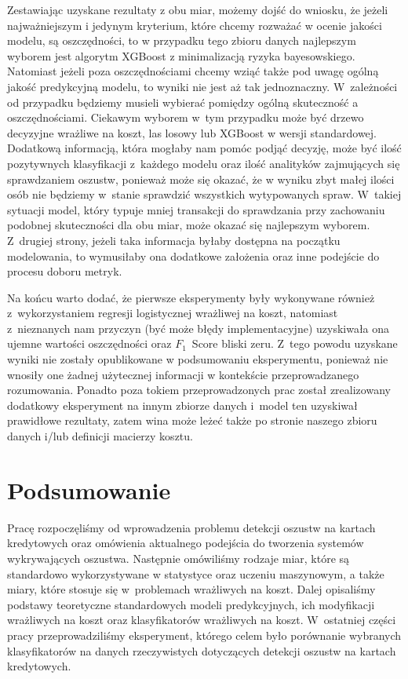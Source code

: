 \documentclass[inzynierska]{pwr_wmat_praca_dyplomowa}
\theoremstyle{plain}
\numberwithin{theorem}{chapter}
\theoremstyle{definition}
\numberwithin{theorem}{chapter}
\begin{document}
Zestawiając uzyskane rezultaty z obu miar, możemy dojść do wniosku, że jeżeli najważniejszym i jedynym kryterium, które chcemy rozważać w ocenie jakości modelu, są oszczędności, to w przypadku tego zbioru danych najlepszym wyborem jest algorytm XGBoost z minimalizacją ryzyka bayesowskiego. Natomiast jeżeli poza oszczędnościami chcemy wziąć także pod uwagę ogólną jakość predykcyjną modelu, to wyniki nie jest aż tak jednoznaczny. W~zależności od przypadku będziemy musieli wybierać pomiędzy ogólną skuteczność a oszczędnościami. Ciekawym wyborem w~tym przypadku może być drzewo decyzyjne wrażliwe na koszt, las losowy lub XGBoost w wersji standardowej. Dodatkową informacją, która mogłaby nam pomóc podjąć decyzję, może być ilość pozytywnych klasyfikacji z~każdego modelu oraz ilość analityków zajmujących się sprawdzaniem oszustw, ponieważ może się okazać, że w wyniku zbyt małej ilości osób nie będziemy w~stanie sprawdzić wszystkich wytypowanych spraw. W~takiej sytuacji model, który typuje mniej transakcji do sprawdzania przy zachowaniu podobnej skuteczności dla obu miar, może okazać się najlepszym wyborem. Z~drugiej strony, jeżeli taka informacja byłaby dostępna na początku modelowania, to wymusiłaby ona dodatkowe założenia oraz inne podejście do procesu doboru metryk.

Na końcu warto dodać, że pierwsze eksperymenty były wykonywane również z~wykorzystaniem regresji logistycznej wrażliwej na koszt, natomiast z~nieznanych nam przyczyn (być może błędy implementacyjne) uzyskiwała ona ujemne wartości oszczędności oraz $F_1$~Score bliski zeru. Z~tego powodu uzyskane wyniki nie zostały opublikowane w podsumowaniu eksperymentu, ponieważ nie wnosiły one żadnej użytecznej informacji w kontekście przeprowadzanego rozumowania. Ponadto poza tokiem przeprowadzonych prac został zrealizowany dodatkowy eksperyment na innym zbiorze danych i~model ten uzyskiwał prawidłowe rezultaty, zatem wina może leżeć także po stronie naszego zbioru danych i/lub definicji macierzy kosztu.

\chapter*{Podsumowanie}
 
Pracę rozpoczęliśmy od wprowadzenia problemu detekcji oszustw na kartach kredytowych oraz omówienia aktualnego podejścia do tworzenia systemów wykrywających oszustwa. Następnie omówiliśmy rodzaje miar, które są standardowo wykorzystywane w statystyce oraz uczeniu maszynowym, a także miary, które stosuje się w~problemach wrażliwych na koszt. Dalej opisaliśmy podstawy teoretyczne standardowych modeli predykcyjnych, ich modyfikacji wrażliwych na koszt oraz klasyfikatorów wrażliwych na koszt. W~ostatniej części pracy przeprowadziliśmy eksperyment, którego celem było porównanie wybranych klasyfikatorów na danych rzeczywistych dotyczących detekcji oszustw na kartach kredytowych.
\end{document}

